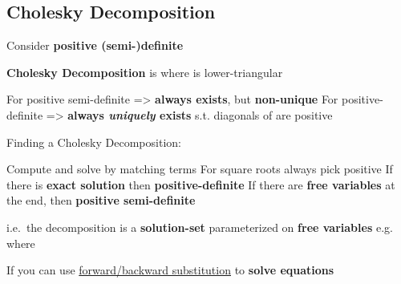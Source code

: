 \subsection*{Cholesky Decomposition}


Consider \textbf{positive (semi-)definite}

\textbf{Cholesky Decomposition} is  where 
is lower-triangular
\begin{itemize}

      \vItem
            For positive semi-definite => \textbf{always exists},
            but \textbf{non-unique}
      \vItem
            For positive-definite => \textbf{always \emph{uniquely}
                  exists} s.t. diagonals of  are positive
\end{itemize}

\hSep %

Finding a Cholesky Decomposition:
\begin{itemize}

      \vItem
            Compute  and solve  by matching terms
      \vItem
            For square roots always pick positive
      \vItem
            If there is \textbf{exact solution} then \textbf{positive-definite}
      \vItem
            If there are \textbf{free variables} at the end, then
            \textbf{positive semi-definite}

            \begin{itemize}

                  \vItem
                        i.e.~the decomposition is a \textbf{solution-set} parameterized on
                        \textbf{free variables}
                  \vItem
                        e.g.~
                        where
            \end{itemize}
\end{itemize}

\hSep %

If  you can use \ul{forward/backward substitution} to
\textbf{solve equations}

